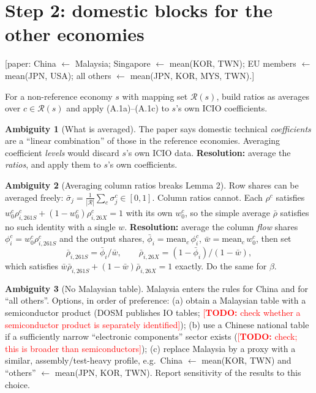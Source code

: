 \documentclass[11pt,a4paper]{article}
\theoremstyle{remark}
\theoremstyle{definition}
\newtheorem{issue}{Ambiguity}
\newcommand{\sem}{{261S}}   %
\newcommand{\oth}{{26X}}    %
\newcommand{\todo}[1]{\textcolor{red}{[\textbf{TODO:} #1]}}
\newcommand{\paper}[1]{\textcolor{blue!50!black}{[paper: #1]}}
\begin{document}
\section{Step 2: domestic blocks for the other economies}

\paper{China $\leftarrow$ Malaysia; Singapore $\leftarrow$ mean(KOR, TWN); EU members $\leftarrow$ mean(JPN, USA);
all others $\leftarrow$ mean(JPN, KOR, MYS, TWN).}

For a non-reference economy $s$ with mapping set $\mathcal{R}(s)$, build ratios as averages over $c\in\mathcal{R}(s)$
and apply (A.1a)--(A.1c) to $s$'s own ICIO coefficients.

\begin{issue}[What is averaged]\label{iss:avg}
The paper says domestic technical \emph{coefficients} are a ``linear combination'' of those in the reference
economies. Averaging coefficient \emph{levels} would discard $s$'s own ICIO data. \textbf{Resolution:} average the
\emph{ratios}, and apply them to $s$'s own coefficients.
\end{issue}

\begin{issue}[Averaging column ratios breaks Lemma 2]\label{iss:colavg}
Row shares can be averaged freely: $\bar\sigma_j = \frac1{|\mathcal R|}\sum_c\sigma^c_j\in[0,1]$.
Column ratios cannot. Each $\rho^c$ satisfies $w^c_0\rho^c_{i,\sem}+(1-w^c_0)\rho^c_{i,\oth}=1$ with its own
$w^c_0$, so the simple average $\bar\rho$ satisfies no such identity with a single $w$.
\textbf{Resolution:} average the column \emph{flow} shares $\phi^c_i = w^c_0\rho^c_{i,\sem}$ and the output shares,
$\bar\phi_i = \mathrm{mean}_c\,\phi^c_i$, $\bar w = \mathrm{mean}_c\,w^c_0$, then set
\[
  \bar\rho_{i,\sem} = \bar\phi_i/\bar w,\qquad \bar\rho_{i,\oth} = (1-\bar\phi_i)/(1-\bar w),
\]
which satisfies $\bar w\bar\rho_{i,\sem}+(1-\bar w)\bar\rho_{i,\oth}=1$ exactly. Do the same for $\beta$.
\end{issue}

\begin{issue}[No Malaysian table]\label{iss:mys}
Malaysia enters the rules for China and for ``all others''. Options, in order of preference:
(a) obtain a Malaysian table with a semiconductor product (DOSM publishes IO tables; \todo{check whether a
semiconductor product is separately identified});
(b) use a Chinese national table if a sufficiently narrow ``electronic components'' sector exists
(\todo{check; this is broader than semiconductors});
(c) replace Malaysia by a proxy with a similar, assembly/test-heavy profile, e.g.\ China $\leftarrow$ mean(KOR, TWN)
and ``others'' $\leftarrow$ mean(JPN, KOR, TWN).
Report sensitivity of the results to this choice.
\end{issue}
\end{document}
